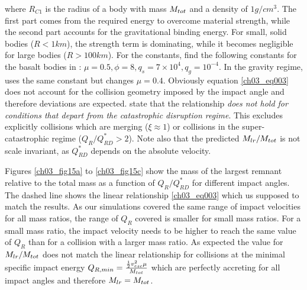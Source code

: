 where $R_{C1}$ is the radius of a body with mass $M_{tot}$ and a density of $1 g/cm^3$. The first part comes from the required energy to overcome material strength, while the second part accounts for the gravitational binding energy. For small, solid bodies ($R < 1km$), the strength term is dominating, while it becomes negligible for large bodies ($R > 100km$). For the constants, \cite{Stewart:2009p3265} find the following constants for the basalt bodies in \cite{Benz1999Icar..142....5B}: $\mu = 0.5, \phi = 8, q_s = 7 \times 10^4, q_g = 10^{-4}$. In the gravity regime, \cite{2010ApJ...712L..73M} uses the same constant but changes $\mu = 0.4$. Obviously equation \ref{ch03_eq003} does not account for the collision geometry imposed by the impact angle and therefore deviations are expected. \cite{Stewart:2009p3265} state that the relationship \emph{does not hold for conditions that depart from the catastrophic disruption regime}. This excludes explicitly collisions which are merging ($\xi \approx 1$) or collisions in the super-catastrophic regime ($Q_R / Q^*_{RD} > 2$). Note also that the predicted $M_{lr} / M_{tot}$ is not scale invariant, as $Q^*_{RD}$ depends on the absolute velocity.

Figures \ref{ch03_fig15a} to \ref{ch03_fig15c} show the mass of the largest remnant relative to the total mass as a function of $Q_R / Q^*_{RD}$ for different impact angles. The dashed line shows the linear relationship \ref{ch03_eq003} which us supposed to match the results. As our simulations covered the same range of impact velocities for all mass ratios, the range of $Q_R$ covered is smaller for small mass ratios. For a small mass ratio, the impact velocity needs to be higher to reach the same value of $Q_R$ than for a collision with a larger mass ratio. As expected the value for $M_{lr} / M_{tot}$ does not match the linear relationship for collisions at the minimal specific impact energy $Q_{R,min} = \frac{ \frac{1}{2} v_{esc}^2 \mu}{M_{tot}}$ which are perfectly accreting for all impact angles and therefore $M_{lr} = M_{tot}$. 

